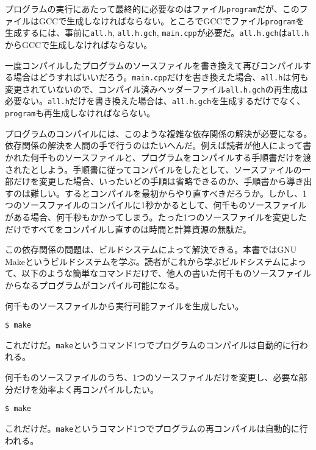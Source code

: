 プログラムの実行にあたって最終的に必要なのはファイル\texttt{program}だが、このファイルはGCCで生成しなければならない。ところでGCCでファイル\texttt{program}を生成するには、事前に\texttt{all.h}, \texttt{all.h.gch}, \texttt{main.cpp}が必要だ。\texttt{all.h.gch}は\texttt{all.h}からGCCで生成しなければならない。

一度コンパイルしたプログラムのソースファイルを書き換えて再びコンパイルする場合はどうすればいいだろう。\texttt{main.cpp}だけを書き換えた場合、\texttt{all.h}は何も変更されていないので、コンパイル済みヘッダーファイル\texttt{all.h.gch}の再生成は必要ない。\texttt{all.h}だけを書き換えた場合は、\texttt{all.h.gch}を生成するだけでなく、\texttt{program}も再生成しなければならない。

プログラムのコンパイルには、このような複雑な依存関係の解決が必要になる。依存関係の解決を人間の手で行うのはたいへんだ。例えば読者が他人によって書かれた何千ものソースファイルと、プログラムをコンパイルする手順書だけを渡されたとしよう。手順書に従ってコンパイルをしたとして、ソースファイルの一部だけを変更した場合、いったいどの手順は省略できるのか、手順書から導き出すのは難しい。するとコンパイルを最初からやり直すべきだろうか。しかし、1つのソースファイルのコンパイルに1秒かかるとして、何千ものソースファイルがある場合、何千秒もかかってしまう。たった1つのソースファイルを変更しただけですべてをコンパイルし直すのは時間と計算資源の無駄だ。

この依存関係の問題は、ビルドシステムによって解決できる。本書ではGNU Makeというビルドシステムを学ぶ。読者がこれから学ぶビルドシステムによって、以下のような簡単なコマンドだけで、他人の書いた何千ものソースファイルからなるプログラムがコンパイル可能になる。

何千ものソースファイルから実行可能ファイルを生成したい。

\begin{lstlisting}[style=terminal]
$ make
\end{lstlisting}

これだけだ。\texttt{make}というコマンド1つでプログラムのコンパイルは自動的に行われる。

何千ものソースファイルのうち、1つのソースファイルだけを変更し、必要な部分だけを効率よく再コンパイルしたい。

\begin{lstlisting}[style=terminal]
$ make
\end{lstlisting}

これだけだ。\texttt{make}というコマンド1つでプログラムの再コンパイルは自動的に行われる。

